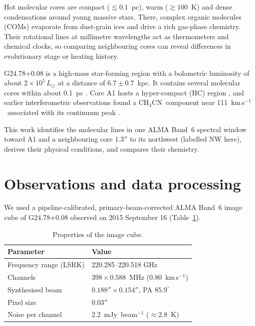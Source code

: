 \documentclass{aa}
\newcommand{\kms}{km\,s$^{-1}$}
\newcommand{\chcn}{CH$_3$CN}
\begin{document}
Hot molecular cores are compact ($\lesssim0.1$~pc), warm ($\gtrsim100$~K) and dense condensations around young massive stars. There, complex organic molecules (COMs) evaporate from dust-grain ices and drive a rich gas-phase chemistry. Their rotational lines at millimetre wavelengths act as thermometers and chemical clocks, so comparing neighbouring cores can reveal differences in evolutionary stage or heating history.

G24.78+0.08 is a high-mass star-forming region with a bolometric luminosity of about $2\times10^5\,L_\odot$ at a distance of $6.7\pm0.7$~kpc. It contains several molecular cores within about 0.1~pc \citep{moscadelli2021}. Core A1 hosts a hyper-compact (HC)  region \citep{moscadelli2018}, and earlier interferometric observations found a \chcn\ component near 111~\kms\ associated with its continuum peak \citep{beltran2011}.

This work identifies the molecular lines in one ALMA Band~6 spectral window toward A1 and a neighbouring core 1.3$''$ to its northwest (labelled NW here), derives their physical conditions, and compares their chemistry.

\section{Observations and data processing}

We used a pipeline-calibrated, primary-beam-corrected ALMA Band~6 image cube of G24.78+0.08 observed on 2015 September 16 (Table~\ref{tab:cube}).

\begin{table}
\caption{Properties of the image cube.}
\label{tab:cube}
\centering
\begin{tabular}{ll}
\hline\hline
Parameter & Value \\
\hline
Frequency range (LSRK) & 220.285--220.518 GHz \\
Channels & $398\times0.588$~MHz (0.80~\kms) \\
Synthesised beam & $0.188''\times0.154''$, PA $85.9^\circ$ \\
Pixel size & $0.03''$ \\
Noise per channel & 2.2~mJy~beam$^{-1}$ ($\approx2.8$~K) \\
\hline
\end{tabular}
\end{table}
\end{document}
